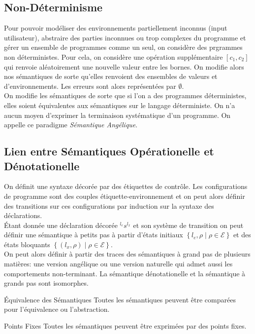 \documentclass{cours}
\begin{document}
\subsection{Non-Déterminisme}
Pour pouvoir modéliser des environnements partiellement inconnus (input utilisateur), abstraire des parties inconnues ou trop complexes du programme et gérer un ensemble de programmes comme un seul, on considère des prgrammes non déterministes. Pour cela, on considère une opération supplémentaire $[c_{1}, c_{2}]$ qui renvoie aléatoirement une nouvelle valeur entre les bornes. On modifie alors nos sémantiques de sorte qu'elles renvoient des ensembles de valeurs et d'environnements. Les erreurs sont alors représentées par $\emptyset$.\\
On modifie les sémantiques de sorte que si l'on a des programmes déterministes, elles soient équivalentes aux sémantiques sur le langage déterministe. On n'a aucun moyen d'exprimer la terminaison systématique d'un programme. On appelle ce paradigme \textit{Sémantique Angélique}.

\subsection{Lien entre Sémantiques Opérationelle et Dénotationelle}
On définit une syntaxe décorée par des étiquettes de contrôle. Les configurations de programme sont des couples étiquette-environnement et on peut alors définir des transitions sur ces configurations par induction sur la syntaxe des déclarations. \\
Étant donnée une déclaration décorée $^{l_{e}}s^{l_{x}}$ et son système de transition on peut définir une sémantique à petits pas à partir d'états initiaux $\left\{l_{e}, \rho \mid \rho \in \mathcal{E}\right\}$ et des états bloquants $\left\{(l_{x}, \rho) \mid \rho \in \mathcal{E}\right\}$.\\
On peut alors définir à partir des traces des sémantiques à grand pas de plusieurs matières: une version angélique ou une version naturelle qui admet aussi les comportements non-terminant. La sémantique dénotationelle et la sémantique à grands pas sont isomorphes.
\begin{théorème}{Équivalence des Sémantiques}{}
Toutes les sémantiques peuvent être comparées pour l'équivalence ou l'abstraction.
\end{théorème}

\begin{théorème}{Points Fixes}{}
Toutes les sémantiques peuvent être exprimées par des points fixes.
\end{théorème}
\end{document}
